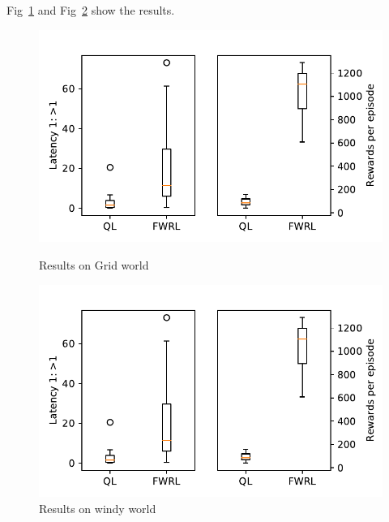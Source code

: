 \documentclass[letterpaper]{article} %
\begin{document}
Fig~\ref{fig:ql-fw-grid-world-results} and Fig~\ref{fig:ql-fw-windy-world-results} show the results.

\begin{figure}%
\includegraphics[width=\columnwidth]{./media/ql-fw-grid-world.pdf}\\
\caption{Results on Grid world}
\label{fig:ql-fw-grid-world-results}%
\end{figure}
\begin{figure}
\includegraphics[width=\columnwidth]{./media/ql-fw-windy-world.pdf}%
\caption{Results on windy world}
\label{fig:ql-fw-windy-world-results}%
\end{figure}
\end{document}

